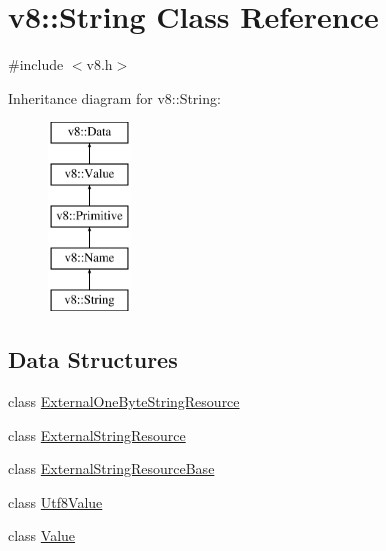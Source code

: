 \hypertarget{classv8_1_1String}{}\section{v8\+:\+:String Class Reference}
\label{classv8_1_1String}


{\ttfamily \#include $<$v8.\+h$>$}

Inheritance diagram for v8\+:\+:String\+:\begin{figure}[H]
\begin{center}
\leavevmode
\includegraphics[height=5.000000cm]{classv8_1_1String}
\end{center}
\end{figure}
\subsection*{Data Structures}
\begin{DoxyCompactItemize}
\item 
class \mbox{\hyperlink{classv8_1_1String_1_1ExternalOneByteStringResource}{External\+One\+Byte\+String\+Resource}}
\item 
class \mbox{\hyperlink{classv8_1_1String_1_1ExternalStringResource}{External\+String\+Resource}}
\item 
class \mbox{\hyperlink{classv8_1_1String_1_1ExternalStringResourceBase}{External\+String\+Resource\+Base}}
\item 
class \mbox{\hyperlink{classv8_1_1String_1_1Utf8Value}{Utf8\+Value}}
\item 
class \mbox{\hyperlink{classv8_1_1String_1_1Value}{Value}}
\end{DoxyCompactItemize}
